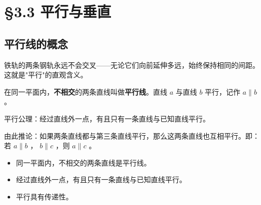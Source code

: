 \chapter{§3.3 平行与垂直}
\label{sec:3.3}





\section*{平行线的概念}


\begin{explore}


铁轨的两条钢轨永远不会交叉——无论它们向前延伸多远，始终保持相同的间距。这就是"平行"的直观含义。

\end{explore}

\begin{understand}


在同一平面内，\textbf{不相交}的两条直线叫做\textbf{平行线}。直线 $a$ 与直线 $b$ 平行，记作 $a \parallel b$ 。

\begin{center}
\label{fig:parallel-lines}
\end{center}


平行公理：经过直线外一点，有且只有一条直线与已知直线平行。

由此推论：如果两条直线都与第三条直线平行，那么这两条直线也互相平行。即：若 $a \parallel b$ ， $b \parallel c$ ，则 $a \parallel c$ 。

\end{understand}

\begin{keytakeaway}


\begin{itemize}
  \item 同一平面内，不相交的两条直线是平行线。
  \item 经过直线外一点，有且只有一条直线与已知直线平行。
  \item 平行具有传递性。
\end{itemize}


\end{keytakeaway}



